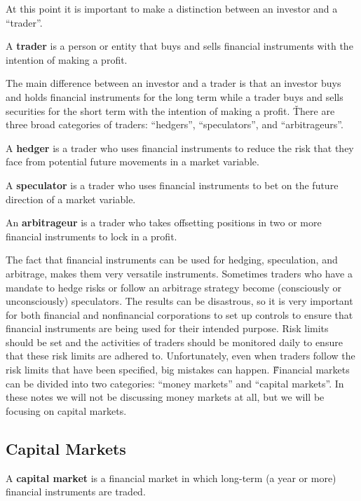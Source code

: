 At this point it is important to make a distinction between an investor and a ``trader''.

\bd[Trader]
A \textbf{trader} is a person or entity that buys and sells financial instruments with the intention of making a profit.
\ed

The main difference between an investor and a trader is that an investor buys and holds financial instruments for the
long term while a trader buys and sells securities for the short term with the intention of making a profit. \v

There are three broad categories of traders: ``hedgers'', ``speculators'', and ``arbitrageurs''.

\bd[Hedger]
A \textbf{hedger} is a trader who uses financial instruments to reduce the risk that they face from potential future
movements in a market variable.
\ed

\bd[Speculator]
A \textbf{speculator} is a trader who uses financial instruments to bet on the future direction of a market variable.
\ed

\bd[Arbitrageur]
An \textbf{arbitrageur} is a trader who takes offsetting positions in two or more financial instruments to lock in a
profit.
\ed

The fact that financial instruments can be used for hedging, speculation, and arbitrage, makes them very versatile
instruments. Sometimes traders who have a mandate to hedge risks or follow an arbitrage strategy become (consciously
or unconsciously) speculators. The results can be disastrous, so it is very important for both financial and
nonfinancial corporations to set up controls to ensure that financial instruments are being used for their intended
purpose. Risk limits should be set and the activities of traders should be monitored daily to ensure that these risk
limits are adhered to. Unfortunately, even when traders follow the risk limits that have been specified, big mistakes
can happen. \v

Financial markets can be divided into two categories: ``money markets'' and ``capital markets''. In these notes we will
not be discussing money markets at all, but we will be focusing on capital markets.

\subsection{Capital Markets}

A \textbf{capital market} is a financial market in which long-term (a year or more) financial instruments are traded.
\ed

